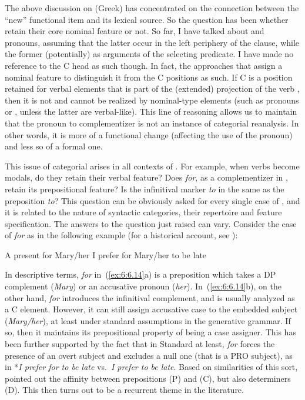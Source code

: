\documentclass[output=paper]{langsci/langscibook}
\begin{document}
The above discussion on (Greek)  has concentrated on the
connection between the \enquote{new} functional item and its lexical source. So
the question has been whether  retain their core nominal
feature or not. So far, I have talked about  and pronouns,
assuming that the latter occur in the left periphery of the clause, while the
former (potentially) as arguments of the selecting predicate. I have made no
reference to the C head as such though. In fact, the approaches that assign a
nominal feature to  distinguish it from the C positions as
such. If C is a position retained for verbal elements that is part of the
(extended) projection of the verb \parencite{ManSav2011}, then it is not and
cannot be realized by nominal-type elements (such as pronouns or
, unless the latter are verbal-like). This line of
reasoning allows us to maintain that the pronoun to
complementizer  is not an instance of
categorial reanalysis. In other words, it is more of a functional change
(affecting the use of the pronoun) and less so of a formal one.

This issue of categorial  arises in
all contexts of . For example, when verbs become modals, do
they retain their verbal feature? Does \emph{for}, as a
complementizer in , retain its prepositional
feature? Is the infinitival marker \emph{to} in  the same as the
preposition \emph{to}? This question can be obviously asked for every single
case of , and it is related to the nature of syntactic
categories, their repertoire and feature specification. The answers to the
question just raised can vary. Consider the case of \emph{for} as in the
following example (for a historical account, see \citealt{vanGelderen2010}):

\ea\label{ex:6:6.14}
	\ea A present for Mary/her
	\ex I prefer for Mary/her to be late
	\z
\z

In descriptive terms, \emph{for} in~(\ref{ex:6:6.14}a) is a preposition which takes a DP
complement (\emph{Mary}) or an accusative pronoun (\emph{her}). In~(\ref{ex:6:6.14}b), on
the other hand, \emph{for} introduces the infinitival complement, and is
usually analyzed as a C element. However, it can still assign accusative case
to the embedded subject (\emph{Mary/her}), at least under standard assumptions
in the generative grammar. If so, then it maintains its prepositional property
of being a case assigner. This has been further supported by the fact that in
Standard  at least, \emph{for} forces the presence of an overt subject
and excludes a null one (that is a PRO subject), as in *\emph{I prefer for to
be late} vs.\ \emph{I prefer to be late}. Based on similarities of this sort,
\parencite{Kayne1984,Kayne2000b} pointed out the affinity between prepositions
(P) and  (C), but also determiners (D). This then turns out to
be a recurrent theme in the literature.
\end{document}
